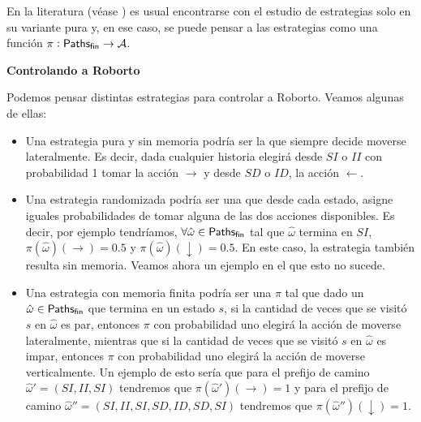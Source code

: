 En la literatura (véase \cite{BaierKatoen, AlfaroThesis}) es usual encontrarse
con el estudio de estrategias solo en su variante pura y, en ese caso, se puede
pensar a las estrategias como una función $\pi: \textsf{Paths}_\textsf{fin} \rightarrow \mathcal{A}$.

\textbf{Controlando a Roborto}

Podemos pensar distintas estrategias para controlar a Roborto. Veamos algunas
de ellas:

\begin{itemize}
	\item Una estrategia pura y sin memoria podría ser la que siempre decide moverse
	      lateralmente. Es decir, dada cualquier historia elegirá desde $SI$ o $II$ con
	      probabilidad 1 tomar la acción $\rightarrow$ y desde $SD$ o $ID$, la acción
	      $\leftarrow$.
	\item Una estrategia randomizada podría ser una que desde cada estado, asigne iguales
	      probabilidades de tomar alguna de las dos acciones disponibles. Es decir, por
	      ejemplo tendríamos, $\forall \hat \omega \in \textsf{Paths}_\textsf{fin}$ tal que $\hat \omega$
	      termina en $SI$, $\pi(\hat \omega)(\rightarrow) = 0.5$ y $\pi(\hat
		      \omega)(\downarrow) = 0.5$.
	      En este caso, la estrategia también resulta sin memoria. Veamos ahora un
	      ejemplo en el que esto no sucede.
	\item Una estrategia con memoria finita podría ser una $\pi$ tal que dado un $\hat
		      \omega \in \textsf{Paths}_\textsf{fin}$ que termina en un estado $s$, si la cantidad de veces que
	      se visitó $s$ en $\hat \omega$ es par, entonces $\pi$ con probabilidad uno
	      elegirá la acción de moverse lateralmente, mientras que si la cantidad de veces
	      que se visitó $s$ en $\hat \omega$ es impar, entonces $\pi$ con probabilidad
	      uno elegirá la acción de moverse verticalmente. Un ejemplo de esto sería que
	      para el prefijo de camino $\hat \omega' = (SI, II, SI)$ tendremos que $\pi(\hat
		      \omega')(\rightarrow) = 1$ y para el prefijo de camino $\hat \omega''=(SI, II,
		      SI, SD, ID, SD, SI)$ tendremos que $\pi(\hat \omega'')(\downarrow) = 1$.
\end{itemize}



